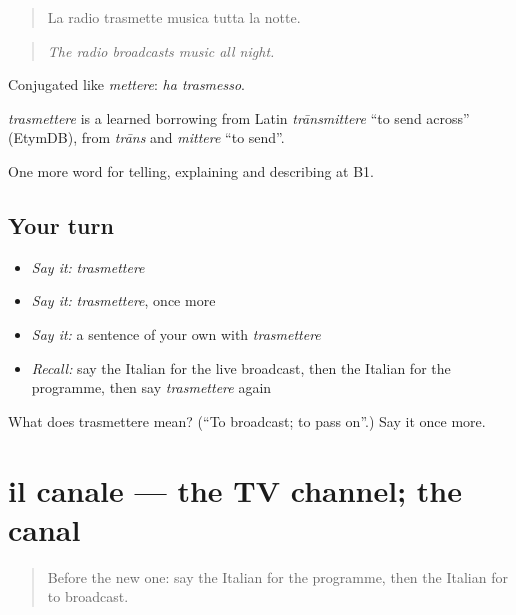\begin{quote}
La radio trasmette musica tutta la notte.
\end{quote}

\begin{quote}
\emph{The radio broadcasts music all night.}
\end{quote}

Conjugated like \emph{mettere}: \emph{ha trasmesso}.

\begin{cousinweb}
\emph{trasmettere} is a learned borrowing from Latin \emph{trānsmittere} \textquotedblleft{}to send across\textquotedblright{} (EtymDB), from \emph{trāns} and \emph{mittere} \textquotedblleft{}to send\textquotedblright{}.
\end{cousinweb}

\begin{grammarlens}[title={What you've built}]
One more word for telling, explaining and describing at B1.
\end{grammarlens}

\subsection*{Your turn}
\begin{itemize}
\raggedright
  \item \emph{Say it:} \emph{trasmettere}
  \item \emph{Say it:} \emph{trasmettere}, once more
  \item \emph{Say it:} a sentence of your own with \emph{trasmettere}
  \item \emph{Recall:} say the Italian for the live broadcast, then the Italian for the programme, then say \emph{trasmettere} again
\end{itemize}

\begin{tcolorbox}[breakable,colback=teal!4,colframe=teal!35!black,title={Before you move on}]
What does trasmettere mean? (\textquotedblleft{}To broadcast; to pass on\textquotedblright{}.) Say it once more.
\end{tcolorbox}
\section[il canale]{il canale — the TV channel; the canal}

\label{lesson:IT-C287-canale}



\begin{quote}
Before the new one: say the Italian for the programme, then the Italian for to broadcast.
\end{quote}

